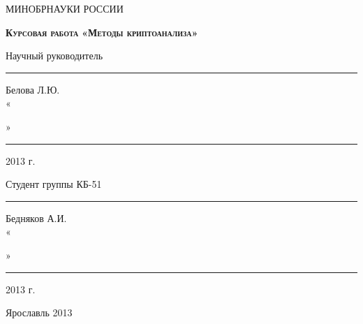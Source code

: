 \begin{titlepage}
    \begin{center}
        МИНОБРНАУКИ РОССИИ
        \linebreak

        \vspace{48pt}{
        Федеральное государственное бюджетное образовательное 
        учреждение высшего профессионального образования
        \linebreak
        «Ярославский государственный университет им. П.Г. Демидова»
        }
        \linebreak

        \vspace{1em}{
        Кафедра компьютерной безопасности и
        математических методов обработки информации
        }
    \end{center}

    \vspace{1em}

    \begin{center}
        \textsc{\textbf{Курсовая работа}}
        \linebreak
        \textsc{\textbf{«Методы криптоанализа»}}
    \end{center}

    \vspace{6em}

	\begin{flushright}
        Научный руководитель \\
        \rule{2,2cm}{1pt} Белова Л.Ю. \\
        «\rule{0,5cm}{1pt}» \rule{2,5cm}{1pt} 2013 г.

        \vspace{1.5em}

        Студент группы КБ-51 \\
        \rule{2cm}{1pt} Бедняков А.И. \\
        «\rule{0,5cm}{1pt}» \rule{2,5cm}{1pt} 2013 г.
	\end{flushright}

    \vspace{\fill}

    \begin{center}
        Ярославль 2013
    \end{center}
\end{titlepage}
